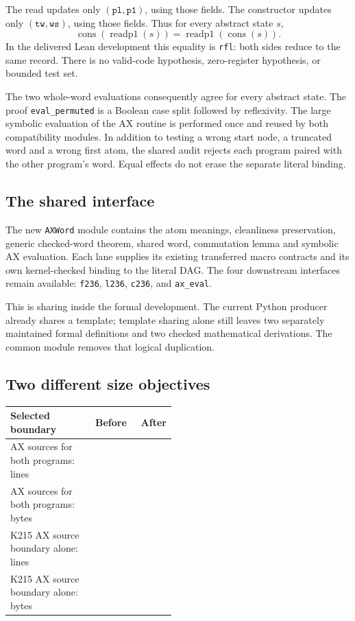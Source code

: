 \documentclass[11pt,letterpaper]{article}
\theoremstyle{definition}\newtheorem{definition}[theorem]{Definition}
\newcommand{\code}[1]{\texttt{#1}}
\begin{document}
The read updates only $(\code{pl},\code{p1})$, using those fields. The constructor
updates only $(\code{tw},\code{ws})$, using those fields. Thus for every abstract
state $s$,
\[
 \operatorname{cons}(\operatorname{readp1}(s))
 =\operatorname{readp1}(\operatorname{cons}(s)).
\]
In the delivered Lean development this equality is \code{rfl}: both sides reduce
to the same record. There is no valid-code hypothesis, zero-register hypothesis,
or bounded test set.

The two whole-word evaluations consequently agree for every abstract state. The
proof \code{eval\_permuted} is a Boolean case split followed by reflexivity. The
large symbolic evaluation of the AX routine is performed once and reused by
both compatibility modules. In addition to testing a wrong start node, a truncated
word and a wrong first atom, the shared audit rejects each program paired with
the other program's word. Equal effects do not erase the separate literal binding.

\subsection{The shared interface}

The new \code{AXWord} module contains the atom meanings, cleanliness preservation,
generic checked-word theorem, shared word, commutation lemma and symbolic AX
evaluation. Each lane supplies its existing transferred macro contracts and its
own kernel-checked binding to the literal DAG. The four downstream interfaces
remain available: \code{f236}, \code{l236}, \code{c236}, and \code{ax\_eval}.

This is sharing inside the formal development. The current Python producer already
shares a template; template sharing alone still leaves two separately maintained
formal definitions and two checked mathematical derivations. The common module
removes that logical duplication.

\subsection{Two different size objectives}

\begin{center}\small
\begin{tabular}{p{0.48\linewidth}rr}
\toprule
Selected boundary & Before & After \\
\midrule
AX sources for both programs: lines & \OldPairLines{} & \SharedLines{} \\
AX sources for both programs: bytes & \OldPairBytes{} & \SharedBytes{} \\
K215 AX source boundary alone: lines & \OldPermLines{} & \SharedPermLines{} \\
K215 AX source boundary alone: bytes & \OldPermBytes{} & \SharedPermBytes{} \\
\bottomrule
\end{tabular}
\end{center}
\end{document}
